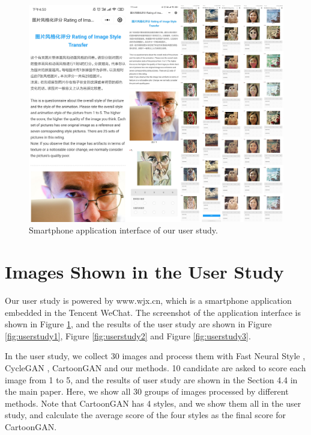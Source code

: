 \documentclass[10pt,twocolumn,letterpaper]{article}
\begin{document}
\begin{figure}[t]
\centering
\includegraphics[width=\linewidth]{figures/userstudy_interface.pdf}
\caption{Smartphone application interface of our user study.}
\label{fig:userstudy_interface}
\end{figure}

\vspace{-0.3em}
\section{Images Shown in the User Study}
\vspace{-0.3em}
Our user study is powered by www.wjx.cn, which is a smartphone application embedded in the Tencent WeChat. The screenshot of the application interface is shown in Figure \ref{fig:userstudy_interface}, and the results of the user study are shown in Figure \ref{fig:userstudy1},  Figure \ref{fig:userstudy2} and  Figure \ref{fig:userstudy3}.

In the user study, we collect 30 images and process them with Fast Neural Style \cite{johnson2016perceptual}, CycleGAN \cite{CycleGAN2017}, CartoonGAN \cite{chen2018cartoongan} and our methods. 10 candidate are asked to score each image from 1 to 5, and the results of user study are shown in the Section 4.4 in the main paper. Here, we show all 30 groups of images processed by different methods. Note that CartoonGAN has 4 styles, and we show them all in the user study, and calculate the average score of the four styles as the final score for CartoonGAN.
\end{document}
